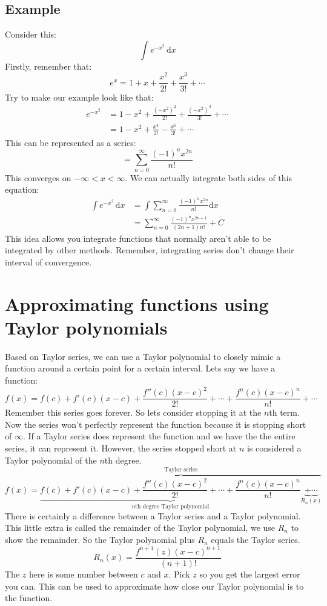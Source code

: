 \documentclass{report}
\begin{document}
    \subsection{Example}
        Consider this:
        \[\int e^{-x^2} \,\mathrm{d}x \]
        Firstly, remember that:
        \[e^x = 1 + x + \frac{x^2}{2!} + \frac{x^3}{3!} + \cdots\]
        Try to make our example look like that:
        \begin{align*}
            e^{-x^2} &= 1 - x^2 + \frac{(-x^2)^2}{2!} + \frac{(-x^2)^3}{3!} + \cdots \\
            &= 1 - x^2 + \frac{x^4}{2!} - \frac{x^6}{3!} + \cdots
        \end{align*}
        This can be represented as a series:
        \[= \sum_{n=0}^{\infty} \frac{(-1)^n x^{2n}}{n!}\]
        This converges on \(- \infty < x < \infty\).
        We can actually integrate both sides of this equation:
        \begin{align*}
            \int e^{-x^2} \,\mathrm{d}x &= \int \sum_{n=0}^{\infty} \frac{(-1)^n x^{2n}}{n!} \mathrm{d}x \\
            &= \sum_{n=0}^{\infty} \frac{(-1)^n x^{2n+1}}{(2n+1)n!} + C
        \end{align*}
        This idea allows you integrate functions that normally aren't able to be integrated by other methods.
        Remember, integrating series don't change their interval of convergence.

\newpage
\section[Taylor polynomials]{Approximating functions using Taylor polynomials}
    Based on Taylor series, we can use a Taylor polynomial to closely mimic a function around a certain point for a certain interval.
    Lets say we have a function:
    \[f(x) = f(c) + f'(c)(x-c) + \frac{f''(c)(x-c)^2}{2!} + \cdots + \frac{f^n(c)(x-c)^n}{n!} + \cdots\]
    Remember this series goes forever. So lets consider stopping it at the \(n\)th term.
    Now the series won't perfectly represent the function because it is stopping short of \(\infty\).
    If a Taylor series does represent the function and we have the the entire series, it can represent it.
    However, the series stopped short at \(n\) is considered a Taylor polynomial of the \(n\)th degree.
    \[f(x) = \overbrace{\underbrace{f(c) + f'(c)(x-c) + \frac{f''(c)(x-c)^2}{2!} + \cdots + \frac{f^n(c)(x-c)^n}{n!}}_{n \text{th degree Taylor polynomial}} \underbrace{+ \cdots}_{R_n(x)}}^{\text{Taylor series}}\]
    There is certainly a difference between a Taylor series and a Taylor polynomial.
    This little extra is called the remainder of the Taylor polynomial, we use \(R_n\) to show the remainder.
    So the Taylor polynomial plus \(R_n\) equals the Taylor series.
    \[R_n(x) = \frac{f^{n+1}(z)(x-c)^{n+1}}{(n+1)!} \]
    The \(z\) here is some number between \(c\) and \(x\).
    Pick \(z\) so you get the largest error you can.
    This can be used to approximate how close our Taylor polynomial is to the function.
    
\end{document}
